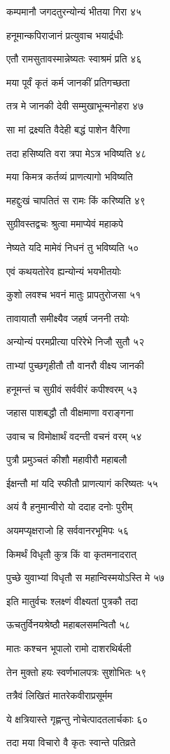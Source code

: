 कम्पमानौ जगदतुरन्योन्यं भीतया गिरा ४५

हनूमान्कपिराजानं प्रत्युवाच भयार्द्रधीः

एतौ रामसुतावस्मान्नेष्यतः स्वाश्रमं प्रति ४६

मया पूर्वं कृतं कर्म जानकीं प्रतिगच्छता

तत्र मे जानकी देवी सम्मुखाभून्मनोहरा ४७

सा मां द्रक्ष्यति वैदेही बद्धं पाशेन वैरिणा

तदा हसिष्यति वरा त्रपा मेऽत्र भविष्यति ४८

मया किमत्र कर्तव्यं प्राणत्यागो भविष्यति

महद्दुःखं चापतितं स रामः किं करिष्यति ४९

सुग्रीवस्तद्वचः श्रुत्वा ममाप्येवं महाकपे

नेष्यते यदि मामेवं निधनं तु भविष्यति ५०

एवं कथयतोरेव ह्यन्योन्यं भयभीतयोः

कुशो लवश्च भवनं मातुः प्रापतुरोजसा ५१

तावायातौ समीक्ष्यैव जहर्ष जननी तयोः

अन्योन्यं परमप्रीत्या परिरेभे निजौ सुतौ ५२

ताभ्यां पुच्छगृहीतौ तौ वानरौ वीक्ष्य जानकी

हनूमन्तं च सुग्रीवं सर्ववीरं कपीश्वरम् ५३

जहास पाशबद्धौ तौ वीक्षमाणा वराङ्गना

उवाच च विमोक्षार्थं वदन्ती वचनं वरम् ५४

पुत्रौ प्रमुञ्चतं कीशौ महावीरौ महाबलौ

ईक्षन्तौ मां यदि स्फीतौ प्राणत्यागं करिष्यतः ५५

अयं वै हनुमान्वीरो यो ददाह दनोः पुरीम्

अयमप्यृक्षराजो हि सर्ववानरभूमिपः ५६

किमर्थं विधृतौ कुत्र किं वा कृतमनादरात्

पुच्छे युवाभ्यां विधृतौ स महान्विस्मयोऽस्ति मे ५७

इति मातुर्वचः श्लक्ष्णं वीक्ष्यतां पुत्रकौ तदा

ऊचतुर्विनयश्रेष्ठौ महाबलसमन्वितौ ५८

मातः कश्चन भूपालो रामो दाशरथिर्बली

तेन मुक्तो हयः स्वर्णभालपत्रः सुशोभितः ५९

तत्रैवं लिखितं मातरेकवीराप्रसूर्मम

ये क्षत्रियास्ते गृह्णन्तु नोचेत्पादतलार्चकाः ६०

तदा मया विचारो वै कृतः स्वान्ते पतिव्रते

